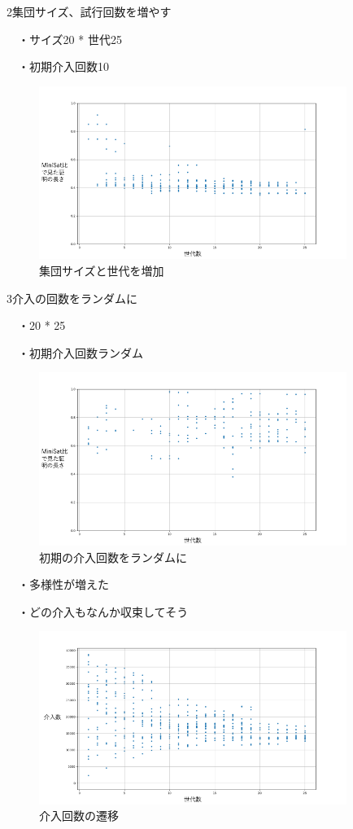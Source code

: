2集団サイズ、試行回数を増やす

　・サイズ20 * 世代25

　・初期介入回数10 %

\begin{figure}[h]
    \centering
    \includegraphics[width=10cm]{figures/Experiment1/2.png}
    \caption{集団サイズと世代を増加}
\end{figure}

3介入の回数をランダムに

　・20 * 25

　・初期介入回数ランダム

\begin{figure}[h]
    \centering
    \includegraphics[width=10cm]{figures/Experiment1/3.png}
    \caption{初期の介入回数をランダムに}
\end{figure}

　・多様性が増えた

　・どの介入もなんか収束してそう

\begin{figure}[h]
    \centering
    \includegraphics[width=10cm]{figures/Experiment1/3-1.png}
    \caption{介入回数の遷移}
\end{figure}

